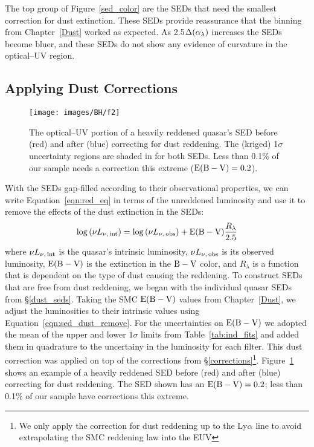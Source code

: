 The top group of Figure~\ref{sed_color} are the SEDs that need the smallest correction for dust extinction.  These SEDs provide reassurance that the binning from Chapter~\ref{Dust} worked as expected. As 2.5$\Delta(\alpha_{\lambda})$ increases the SEDs become bluer, and these SEDs do not show any evidence of curvature in the optical--UV region.

\subsection{Applying Dust Corrections} \label{dust_corrections}

\begin{figure}[tp]
\begin{center}
	\texttt{[image: images/BH/f2]}
\caption[Typical reddening correction]{\label{typ_corr} The optical--UV portion of a heavily reddened quasar's SED before (red) and after (blue) correcting for dust reddening.  The (kriged) 1$\sigma$ uncertainty regions are shaded in for both SEDs.  Less than 0.1\% of our sample needs a correction this extreme (${\rm E(B-V)}=0.2$).}
\end{center}
\end{figure}

With the SEDs gap-filled according to their observational properties, we can write Equation~\ref{eqn:red_eq} in terms of the unreddened luminosity and use it to remove the effects of the dust extinction in the SEDs:
\begin{equation} \label{eqn:sed_dust_remove}
 \log{(\nu L_{\nu{\rm ,\, int}})} = \log{(\nu L_{\nu{\rm ,\, obs}})} + \ebv \frac{R_\lambda}{2.5} 
\end{equation}
where $\nu L_{\nu{\rm ,\, int}}$ is the quasar's intrinsic luminosity, $\nu L_{\nu{\rm ,\, obs}}$ is its observed luminosity, ${\rm E(B-V)}$ is the extinction in the ${\rm B-V}$ color, and $R_\lambda$ is a function that is dependent on the type of dust causing the reddening.  To construct SEDs that are free from dust reddening, we began with the individual quasar SEDs from \S\ref{dust_seds}.  Taking the SMC ${\rm E(B-V)}$ values from Chapter~\ref{Dust}, we adjust the luminosities to their intrinsic values using Equation~\ref{eqn:sed_dust_remove}. For the uncertainties on ${\rm E(B-V)}$ we adopted the mean of the upper and lower $1\sigma$ limits from Table~\ref{tab:ind_fits} and added them in quadrature to the uncertainy in the luminosity for each filter.  This dust correction was applied on top of the corrections from \S\ref{corrections}\footnote{We only apply the correction for dust reddening up to the Ly$\alpha$ line to avoid extrapolating the SMC reddening law into the EUV}.  Figure~\ref{typ_corr} shows an example of a heavily reddened SED before (red) and after (blue) correcting for dust reddening. The SED shown has an ${\rm E(B-V)}=0.2$; less than 0.1\% of our sample have corrections this extreme.

